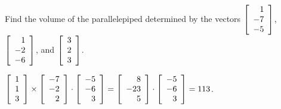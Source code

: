 \documentclass{ximera}
\author{Zack Reed}
\begin{document}
  \begin{example}
    Find the volume of the parallelepiped determined by the vectors
    $\startmat{r}
      1 \\
      -7 \\
      -5
    \stopmat$,
    $\startmat{r}
      1 \\
      -2 \\
      -6
    \stopmat$, and $\startmat{r}
      3 \\
      2 \\
      3
    \stopmat$.
    \begin{solution}
      $\startmat{r}1\\1\\3\stopmat
        \times \startmat{r}-7\\-2\\2\stopmat 
      \cdot \startmat{r}-5\\-6\\3\stopmat =
      \startmat{r}8\\-23\\5\stopmat
      \cdot \startmat{r}-5\\-6\\3\stopmat =
      113$.
    \end{solution}
  \end{example}
\end{document}
